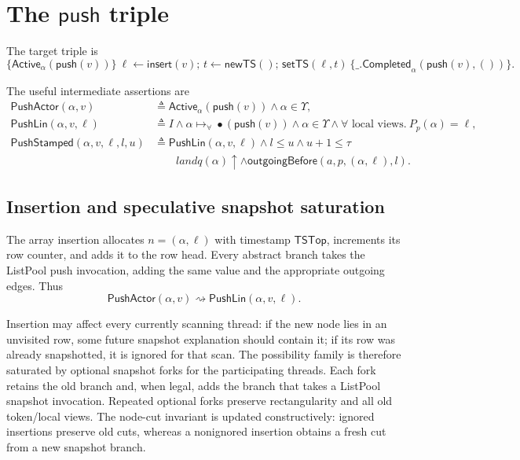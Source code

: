 \documentclass[11pt]{article}
\theoremstyle{definition}
\theoremstyle{remark}
\newcommand{\topts}{\mathsf{TSTop}}
\newcommand{\Push}{\mathsf{push}}
\newcommand{\tran}{\mathrel{\rightsquigarrow}}
\newcommand{\alltok}[2]{#1\mathrel{\mapsto_{\forall}}#2}
\begin{document}
\section{The \texorpdfstring{\(\Push\)}{push} triple}

The target triple is
\[
\boxed{
\{\mathsf{Active}_\alpha(\Push(v))\}
\ \ell\leftarrow\mathsf{insert}(v);\,
 t\leftarrow\mathsf{newTS}();\,
 \mathsf{setTS}(\ell,t)\ 
\{\_.\mathsf{Completed}_\alpha(\Push(v),())\}.
}
\]

The useful intermediate assertions are
\begin{align*}
\mathsf{PushActor}(\alpha,v)
  &\triangleq \mathsf{Active}_\alpha(\Push(v))\land\alpha\in\Upsilon,
\\
\mathsf{PushLin}(\alpha,v,\ell)
  &\triangleq I\land\alltok{\alpha}{\bullet(\Push(v))}
    \land\alpha\in\Upsilon
    \land \forall\text{ local views}.\ P_p(\alpha)=\ell,
\\
\mathsf{PushStamped}(\alpha,v,\ell,l,u)
  &\triangleq \mathsf{PushLin}(\alpha,v,\ell)
    \land l\le u\land u+1\le\tau
\\&\qquad{}land q(\alpha)\uparrow
    \land\mathsf{outgoingBefore}(a,p,(\alpha,\ell),l).
\end{align*}

\subsection{Insertion and speculative snapshot saturation}

The array insertion allocates \(n=(\alpha,\ell)\) with timestamp \(\topts\),
increments its row counter, and adds it to the row head.  Every abstract branch
takes the ListPool push invocation, adding the same value and the appropriate
outgoing edges.  Thus
\[
  \mathsf{PushActor}(\alpha,v)
  \tran \mathsf{PushLin}(\alpha,v,\ell).
\]

Insertion may affect every currently scanning thread: if the new node lies in
an unvisited row, some future snapshot explanation should contain it; if its
row was already snapshotted, it is ignored for that scan.  The possibility
family is therefore saturated by optional snapshot forks for the participating
threads.  Each fork retains the old branch and, when legal, adds the branch
that takes a ListPool snapshot invocation.  Repeated optional forks preserve
rectangularity and all old token/local views.  The node-cut invariant is
updated constructively: ignored insertions preserve old cuts, whereas a
nonignored insertion obtains a fresh cut from a new snapshot branch.
\end{document}
